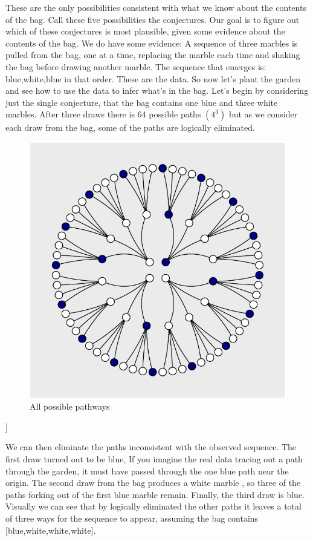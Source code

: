 \documentclass{article}
\begin{document}
These are the only possibilities consistent with what we know about the
contents of the bag. Call these five possibilities the conjectures. Our
goal is to figure out which of these conjectures is most plausible,
given some evidence about the contents of the bag. We do have some
evidence: A sequence of three marbles is pulled from the bag, one at a
time, replacing the marble each time and shaking the bag before drawing
another marble. The sequence that emerges is: blue,white,blue in that
order. These are the data. So now let's plant the garden and see how to
use the data to infer what's in the bag. Let's begin by considering just
the single conjecture, that the bag contains one blue and three white
marbles. After three draws there is 64 possible paths \((4^3)\) but as
we consider each draw from the bag, some of the paths are logically
eliminated.

\begin{figure}

{\centering \includegraphics{qrap_paper_files/figure-latex/forking_paths-1} 

}

\caption{All possible pathways}\label{fig:forking_paths}
\end{figure}

{]}

We can then eliminate the paths inconsistent with the observed sequence.
The first draw turned out to be blue, If you imagine the real data
tracing out a path through the garden, it must have passed through the
one blue path near the origin. The second draw from the bag produces a
white marble , so three of the paths forking out of the first blue
marble remain. Finally, the third draw is blue. Visually we can see that
by logically eliminated the other paths it leaves a total of three ways
for the sequence to appear, assuming the bag contains
{[}blue,white,white,white{]}.
\end{document}
